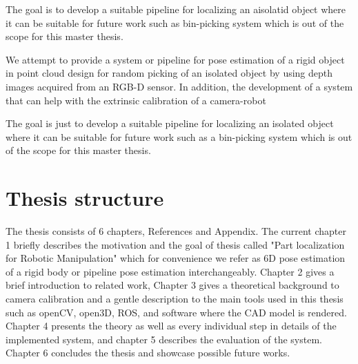 The goal is to develop a suitable pipeline for localizing an aisolatid object where it can be suitable for future work such as bin-picking system which is out of the scope for this master thesis.
\fi

We attempt to provide a system or pipeline for pose estimation of a rigid object in point cloud design for random picking of an isolated object by using depth images acquired from an RGB-D sensor. In addition, the development of a system that can help with the extrinsic calibration of a camera-robot

The goal is just to develop a suitable pipeline for localizing an isolated object where it can be suitable for future work such as a bin-picking system which is out of the scope for this master thesis.


\section{Thesis structure}

The thesis consists of 6 chapters, References and Appendix. The current chapter 1 briefly describes the motivation and the goal of thesis called "Part localization for Robotic Manipulation" which for convenience we refer as 6D pose estimation of a rigid body or pipeline pose estimation interchangeably. Chapter 2 gives a brief introduction to related work, Chapter 3 gives a theoretical background to camera calibration and a gentle description to the main tools used in this thesis such as openCV, open3D, ROS, and software where the CAD model is rendered. Chapter 4 presents the theory as well as every individual step in details of the implemented system, and chapter 5 describes the evaluation of the system. Chapter 6 concludes the thesis and showcase possible future works.

